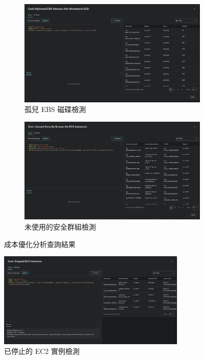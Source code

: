\documentclass[11pt,a4paper]{ctexart}
\begin{document}
\begin{figure}[H]
\centering
\begin{subfigure}[b]{0.48\textwidth}
\centering
\includegraphics[width=\textwidth]{Orphaned EBS Volumes.png}
\caption{孤兒 EBS 磁碟檢測}
\label{fig:orphaned_ebs}
\end{subfigure}
\hfill
\begin{subfigure}[b]{0.48\textwidth}
\centering
\includegraphics[width=\textwidth]{Unused Security Groups.png}
\caption{未使用的安全群組檢測}
\label{fig:unused_sg}
\end{subfigure}
\caption{成本優化分析查詢結果}
\label{fig:cost_analysis_results}
\end{figure}

\begin{figure}[H]
\centering
\includegraphics[width=0.8\textwidth]{Stopped EC2 Instances.png}
\caption{已停止的 EC2 實例檢測}
\label{fig:stopped_ec2}
\end{figure}
\end{document}
